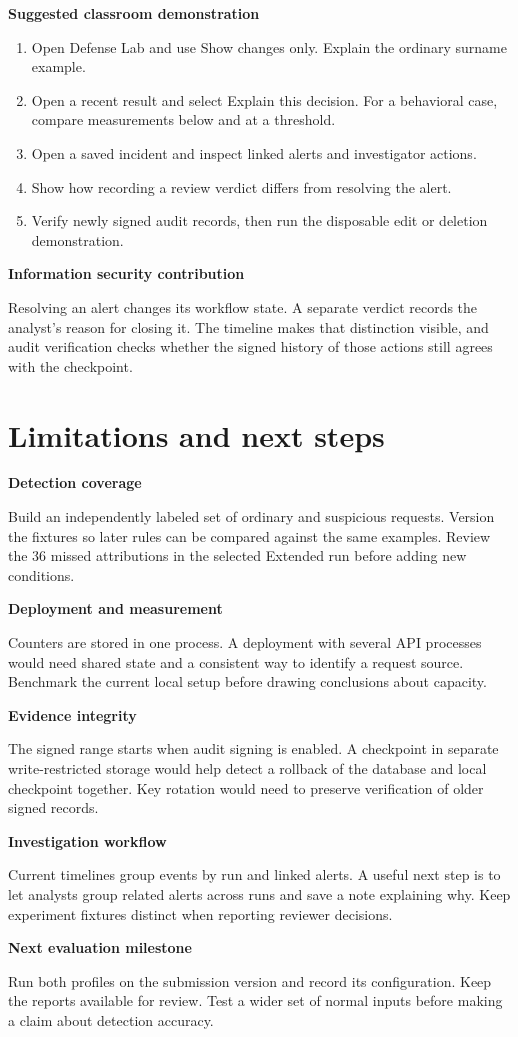 \documentclass[11pt,a4paper,oneside]{report}
\newcommand{\topic}[1]{\par\addvspace{4pt}\noindent\textbf{#1}\par\nobreak\vspace{-.20em}}
\newcommand{\sheet}[1]{\clearpage\section{#1}}
\begin{document}
\topic{Suggested classroom demonstration}
\begin{enumerate}
\item Open Defense Lab and use Show changes only. Explain the ordinary surname example.
\item Open a recent result and select Explain this decision. For a behavioral case, compare measurements below and at a threshold.
\item Open a saved incident and inspect linked alerts and investigator actions.
\item Show how recording a review verdict differs from resolving the alert.
\item Verify newly signed audit records, then run the disposable edit or deletion demonstration.
\end{enumerate}

\topic{Information security contribution}
Resolving an alert changes its workflow state. A separate verdict records the analyst's reason for closing it. The timeline makes that distinction visible, and audit verification checks whether the signed history of those actions still agrees with the checkpoint.

\sheet{Limitations and next steps}
\topic{Detection coverage}
Build an independently labeled set of ordinary and suspicious requests. Version the fixtures so later rules can be compared against the same examples. Review the 36 missed attributions in the selected Extended run before adding new conditions.

\topic{Deployment and measurement}
Counters are stored in one process. A deployment with several API processes would need shared state and a consistent way to identify a request source. Benchmark the current local setup before drawing conclusions about capacity.

\topic{Evidence integrity}
The signed range starts when audit signing is enabled. A checkpoint in separate write-restricted storage would help detect a rollback of the database and local checkpoint together. Key rotation would need to preserve verification of older signed records.

\topic{Investigation workflow}
Current timelines group events by run and linked alerts. A useful next step is to let analysts group related alerts across runs and save a note explaining why. Keep experiment fixtures distinct when reporting reviewer decisions.

\topic{Next evaluation milestone}
Run both profiles on the submission version and record its configuration. Keep the reports available for review. Test a wider set of normal inputs before making a claim about detection accuracy.
\end{document}
